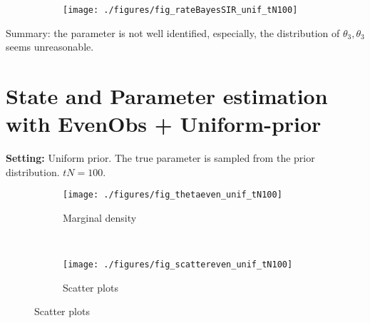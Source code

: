 \documentclass[12pt]{article}
\begin{document}
\begin{figure}[h!]
   \caption{Update rate}\label{fig:traj} \vspace{-2mm}
    \centering
    \hspace{-20mm}
    \begin{subfigure}[b]{0.45\textwidth}       %
        \texttt{[image: ./figures/fig\_rateBayesSIR\_unif\_tN100]} %
        \label{fig:gull}
    \end{subfigure}
\end{figure}
Summary: the parameter is not well identified, especially, the distribution of $\theta_3, \theta_3$ seems unreasonable.  

\newpage
\section{State and Parameter estimation with EvenObs + Uniform-prior}
{\bf Setting:} Uniform prior. The true parameter is sampled from the prior distribution. $tN=100$. 
\begin{figure}[h!]
   \caption{Parameter estimation}\label{fig:traj} \vspace{-2mm}
    \centering
    \hspace{-20mm}
    \begin{subfigure}[b]{0.45\textwidth}        \caption{Marginal density}\vspace{-2mm}
        \texttt{[image: ./figures/fig\_thetaeven\_unif\_tN100]} %
        \label{fig:gull}
    \end{subfigure}
    ~ %
    \begin{subfigure}[b]{0.45\textwidth}          \caption{Scatter plots}\vspace{-2mm}
        \texttt{[image: ./figures/fig\_scattereven\_unif\_tN100]} %
        \label{fig:tiger}
    \end{subfigure}
\end{figure}
\end{document}
